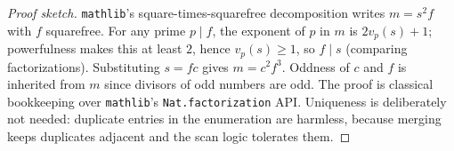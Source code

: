 \documentclass[10pt,a4paper]{amsart}
\newcommand{\code}[1]{\texttt{#1}}
\begin{document}
\begin{proof}[Proof sketch]
\code{mathlib}'s square-times-squarefree decomposition writes
$m = s^2 f$ with $f$ squarefree. For any prime $p \mid f$, the exponent
of $p$ in $m$ is $2 v_p(s) + 1$; powerfulness makes this at least $2$,
hence $v_p(s) \ge 1$, so $f \mid s$ (comparing factorizations).
Substituting $s = f c$ gives $m = c^2 f^3$. Oddness of $c$ and $f$ is
inherited from $m$ since divisors of odd numbers are odd. The proof is
classical bookkeeping over \code{mathlib}'s \code{Nat.factorization}
API. Uniqueness is deliberately not needed: duplicate entries in the
enumeration are harmless, because merging keeps duplicates adjacent and
the scan logic tolerates them.
\end{proof}
\end{document}
